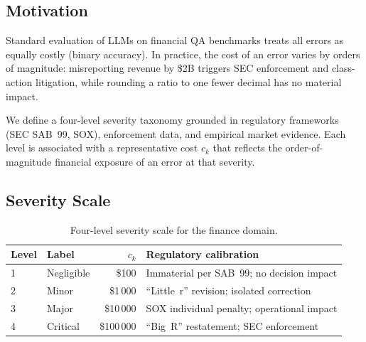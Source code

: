 

\subsection{Motivation}

Standard evaluation of LLMs on financial QA benchmarks treats all errors
as equally costly (binary accuracy). In practice, the cost of an error
varies by orders of magnitude: misreporting revenue by \$2B triggers
SEC enforcement and class-action litigation, while rounding a ratio to
one fewer decimal has no material impact.

We define a four-level severity taxonomy grounded in regulatory
frameworks (SEC SAB~99, SOX), enforcement data, and empirical market
evidence. Each level is associated with a representative cost $c_k$
that reflects the order-of-magnitude financial exposure of an error
at that severity.

\subsection{Severity Scale}
\label{sec:severity-scale}

\begin{table}[h]
\centering
\footnotesize
\setlength{\tabcolsep}{4pt}
\begin{tabular}{@{}llrp{3.4cm}@{}}
\toprule
Level & Label & $c_k$ & Regulatory calibration \\
\midrule
1 & Negligible & \$100      & Immaterial per SAB~99; no decision impact \\
2 & Minor      & \$1\,000   & \enquote{Little~r} revision; isolated correction \\
3 & Major      & \$10\,000  & SOX individual penalty; operational impact \\
4 & Critical   & \$100\,000 & \enquote{Big~R} restatement; SEC enforcement \\
\bottomrule
\end{tabular}
\caption{Four-level severity scale for the finance domain.}
\label{tab:severity-scale}
\end{table}

